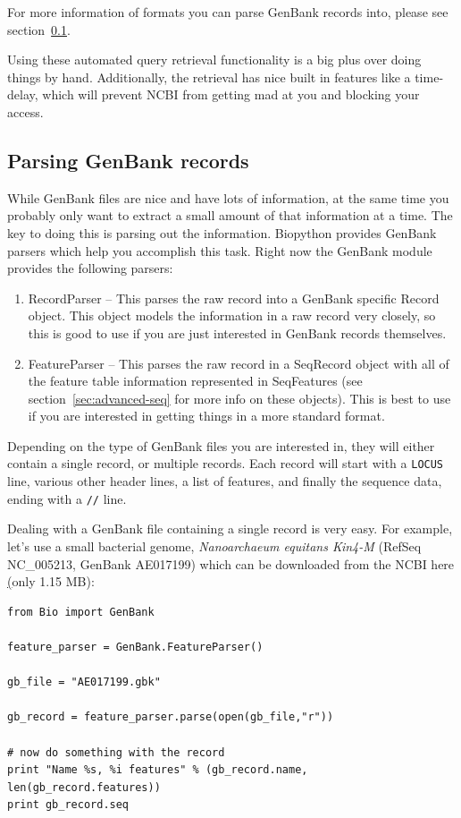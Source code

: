 \documentclass{report}
\begin{document}
For more information of formats you can parse GenBank records into, please see section~\ref{sec:gb-parsing}.

Using these automated query retrieval functionality is a big plus over doing things by hand. Additionally, the retrieval has nice built in features like a time-delay, which will prevent NCBI from getting mad at you and blocking your access.

\subsection{Parsing GenBank records}
\label{sec:gb-parsing}

While GenBank files are nice and have lots of information, at the same time you probably only want to extract a small amount of that information at a time. The key to doing this is parsing out the information. Biopython provides GenBank parsers which help you accomplish this task. Right now the GenBank module provides the following parsers:

\begin{enumerate}
  \item RecordParser -- This parses the raw record into a GenBank specific Record object. This object models the information in a raw record very closely, so this is good to use if you are just interested in GenBank records themselves.

  \item FeatureParser -- This parses the raw record in a SeqRecord object with all of the feature table information represented in SeqFeatures (see section~\ref{sec:advanced-seq} for more info on these objects). This is best to use if you are interested in getting things in a more standard format.
\end{enumerate}

Depending on the type of GenBank files you are interested in, they will either contain a single record, or multiple records.  Each record will start with a {\tt LOCUS} line, various other header lines, a list of features, and finally the sequence data, ending with a {\tt //} line.

Dealing with a GenBank file containing a single record is very easy.  For example, let's use a small bacterial genome, \emph{Nanoarchaeum equitans Kin4-M} (RefSeq NC\_005213, GenBank AE017199) which can be downloaded from the NCBI here \href{ftp://ftp.ncbi.nlm.nih.gov/genbank/genomes/Bacteria/Nanoarchaeum_equitans/AE017199.gbk} (only 1.15 MB):

\begin{verbatim}
from Bio import GenBank

feature_parser = GenBank.FeatureParser()

gb_file = "AE017199.gbk"

gb_record = feature_parser.parse(open(gb_file,"r"))

# now do something with the record
print "Name %s, %i features" % (gb_record.name, len(gb_record.features))
print gb_record.seq
\end{verbatim}
\end{document}
